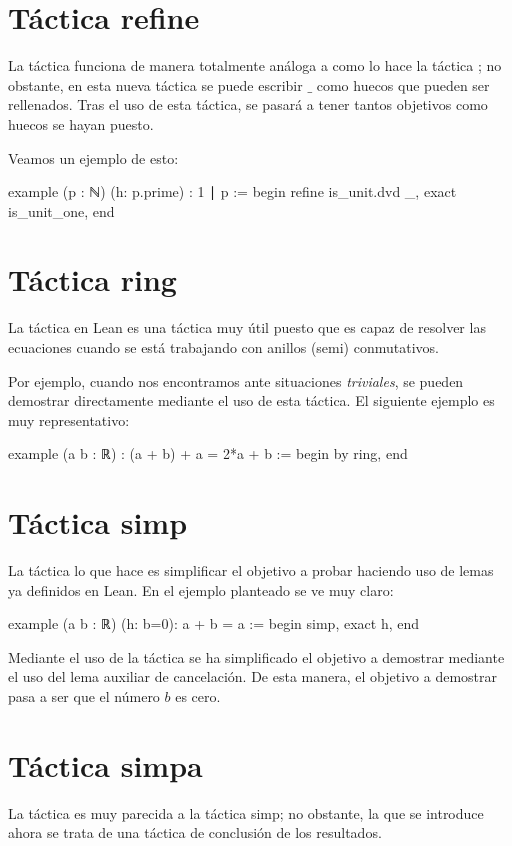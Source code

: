 \section{Táctica refine}
La táctica  funciona de manera totalmente análoga a como
lo hace la táctica ; no obstante, en esta nueva táctica se
puede escribir \(\_\) como huecos que pueden ser rellenados. Tras el uso de
esta táctica, se pasará a tener tantos objetivos como huecos se hayan puesto.

Veamos un ejemplo de esto:

\begin{leancode}
example (p : ℕ) (h: p.prime) : 1 ∣ p :=
begin
  refine is_unit.dvd _,
  exact is_unit_one,
end
\end{leancode}


\section{Táctica ring}
La táctica  en Lean es una táctica muy útil puesto que es
capaz de resolver las ecuaciones cuando se está trabajando con anillos
(semi) conmutativos.

Por ejemplo, cuando nos encontramos ante situaciones \textit{triviales}, se
pueden demostrar directamente mediante el uso de esta táctica. El siguiente
ejemplo es muy representativo:

\begin{leancode}
example (a b : ℝ) : (a + b) + a = 2*a + b :=
begin
  by ring,
end
\end{leancode}

\section{Táctica simp}
La táctica  lo que hace es simplificar el objetivo a probar
haciendo uso de lemas ya definidos en Lean. En el ejemplo planteado se ve muy
claro:
\begin{leancode}
example (a b : ℝ) (h: b=0): a + b = a :=
begin
  simp,
  exact h,
end
\end{leancode}

Mediante el uso de la táctica  se ha simplificado el
objetivo a demostrar mediante el uso del lema auxiliar de cancelación. De esta
manera, el objetivo a demostrar pasa a ser que el número \(b\) es cero.



\section{Táctica simpa}
La táctica  es muy parecida a la táctica 
{simp}; no obstante, la que se introduce ahora se trata de una táctica de
conclusión de los resultados.

